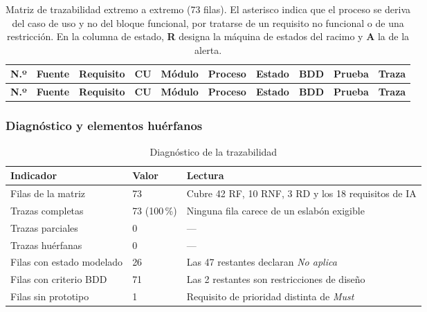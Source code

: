 {\scriptsize
\begin{longtable}{|M{0.7cm}|L{1.9cm}|M{1.3cm}|M{1.0cm}|M{1.0cm}|M{1.1cm}|L{3.2cm}|M{1.1cm}|M{1.0cm}|M{1.3cm}|}
\caption{Matriz de trazabilidad extremo a extremo (73 filas). El asterisco indica que el proceso se deriva del caso de uso y no del bloque funcional, por tratarse de un requisito no funcional o de una restricción. En la columna de estado, \textbf{R} designa la máquina de estados del racimo y \textbf{A} la de la alerta.}
\label{tab:matriz-e2e}\\
\hline
{}\textbf{N.º} & \textbf{Fuente} & \textbf{Requisito} & \textbf{CU} & \textbf{Módulo} & \textbf{Proceso} & \textbf{Estado} & \textbf{BDD} & \textbf{Prueba} & \textbf{Traza}\\ \hline
\endfirsthead
\hline
{}\textbf{N.º} & \textbf{Fuente} & \textbf{Requisito} & \textbf{CU} & \textbf{Módulo} & \textbf{Proceso} & \textbf{Estado} & \textbf{BDD} & \textbf{Prueba} & \textbf{Traza}\\ \hline
\endhead

\end{longtable}}

\subsubsection*{Diagnóstico y elementos huérfanos}

\begin{table}[H]
\centering\footnotesize
\caption{Diagnóstico de la trazabilidad}
\label{tab:diag-traza}
\begin{tabular}{|L{7.0cm}|C{2.4cm}|L{6.2cm}|}
\hline
{}\textbf{Indicador} & \textbf{Valor} & \textbf{Lectura}\\ \hline
Filas de la matriz & 73 & Cubre 42 RF, 10 RNF, 3 RD y los 18 requisitos de IA\\ \hline
Trazas completas & 73 (100\,\%) & Ninguna fila carece de un eslabón exigible\\ \hline
Trazas parciales & 0 & ---\\ \hline
Trazas huérfanas & 0 & ---\\ \hline
Filas con estado modelado & 26 & Las 47 restantes declaran \emph{No aplica}\\ \hline
Filas con criterio BDD & 71 & Las 2 restantes son restricciones de diseño\\ \hline
Filas sin prototipo & 1 & Requisito de prioridad distinta de \emph{Must}\\ \hline
\end{tabular}
\end{table}


